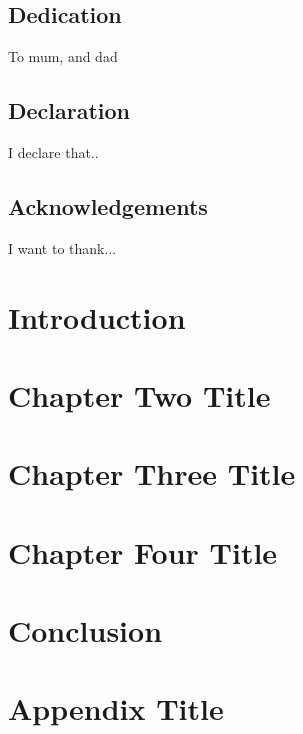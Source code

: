 \documentclass[12pt]{report}
\begin{document}
\maketitle
\newpage


\section*{Dedication}
To mum, and dad

\section*{Declaration}
I declare that..

\section*{Acknowledgements}
I want to thank...

\tableofcontents
\listoffigures
\listoftables

\chapter{Introduction}


\chapter{Chapter Two Title}


\chapter{Chapter Three Title}


\chapter{Chapter Four Title}


\chapter{Conclusion}


\appendix
\chapter{Appendix Title}

\end{document}

